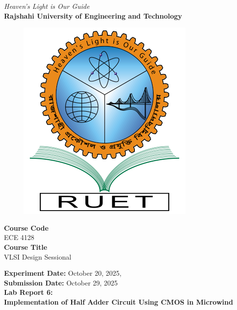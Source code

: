 \vspace*{\fill}
\begin{center}

    \emph{Heaven's Light is Our Guide} \\
    \textbf{Rajshahi University of Engineering and Technology} \\

    \begin{figure}[H]
        \centering
        \includegraphics[scale=.34]{images/RUET_logo.png}
        \label{fig:ruet_logo}
    \end{figure}
    \vspace{5mm}

    \textbf{Course Code}\\
    ECE 4128\\
    \vspace{3mm}
    \textbf{Course Title}\\
    VLSI Design Sessional

    \vspace{5mm}
    \textbf{Experiment Date:} {October 20, 2025},\\
    \textbf{Submission Date:} {October 29, 2025}\\

    \vspace{5mm}
    \textbf{Lab Report 6: \\
        Implementation of Half Adder Circuit Using CMOS in Microwind}


\end{center}
